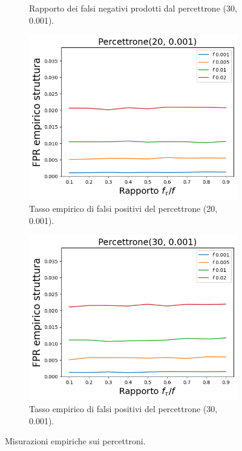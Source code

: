 \documentclass[../../main.tex]{subfiles}
\begin{document}
\begin{figure}[H]
\begin{subfigure}[b]{0.49\textwidth}
            \caption{Rapporto dei falsi negativi prodotti dal percettrone (30, 0.001).}
            \label{fig:LBFFNRPercettrone30}
        \end{subfigure}
        \begin{subfigure}[b]{0.49\textwidth}
            \centering
            \includegraphics[width = \textwidth]{immagini/7/LBF/Percettrone(20, 0.001)_FPR.png}
            \caption{Tasso empirico di falsi positivi del percettrone (20, 0.001).}
            \label{fig:LBFFPRPercettrone20}
        \end{subfigure}
        \begin{subfigure}[b]{0.49\textwidth}
            \centering
            \includegraphics[width = \textwidth]{immagini/7/LBF/Percettrone(30, 0.001)_FPR.png}
            \caption{Tasso empirico di falsi positivi del percettrone (30, 0.001).}
            \label{fig:LBFFPRPercettrone30}
        \end{subfigure}
        \caption{Misurazioni empiriche sui percettroni.}
        \label{fig:percettroneEmpiricoLBF}
    \end{figure}
\end{document}
